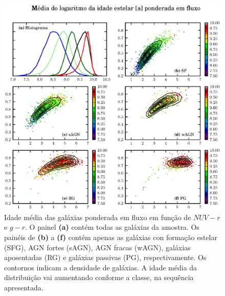 \begin{figure}
	\includegraphics{figuras/uvcolor-color-at_flux-byclass.eps}
	\caption[Idade média das galáxias ponderada em fluxo no diagrama cor--cor UV.]
	{Idade média das galáxias ponderada em fluxo em função de $NUV-r$ e $g-r$. O
	painel \textbf{(a)} contém todas as galáxias da amostra. Os painéis de
	\textbf{(b)} a \textbf{(f)} contém apenas as galáxias con formação estelar
	(SFG), AGN fortes (sAGN), AGN fracas (wAGN), galáxias aposentadas (RG) e
	galáxias passivas (PG), respectivamente. Os contornos indicam a densidade de
	galáxias. A idade média da distribuição vai aumentando conforme a classe, na
	sequência apresentada.}
	\label{fig:ATFluxColor}
\end{figure}


